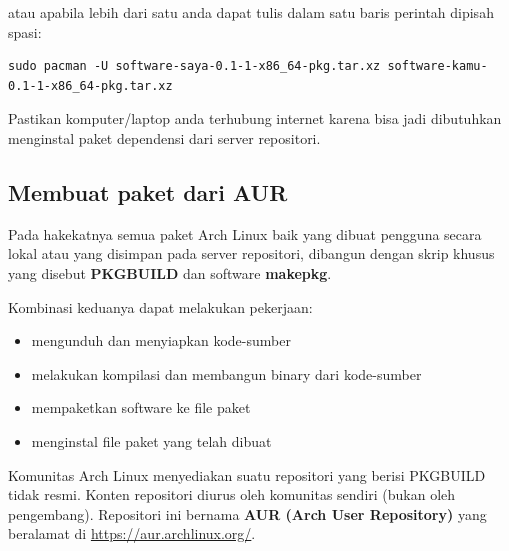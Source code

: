 \documentclass[12pt,]{article}
\begin{document}
	atau apabila lebih dari satu anda dapat tulis dalam satu baris perintah dipisah spasi:
	\begin{verbatim}
sudo pacman -U software-saya-0.1-1-x86_64-pkg.tar.xz software-kamu-0.1-1-x86_64-pkg.tar.xz
	\end{verbatim}
	
	Pastikan komputer/laptop anda terhubung internet karena bisa jadi dibutuhkan menginstal paket dependensi dari server repositori.
	
	\subsection{Membuat paket dari AUR}
	Pada hakekatnya semua paket Arch Linux baik yang dibuat pengguna secara lokal atau yang disimpan pada server repositori,
	dibangun dengan skrip khusus yang disebut \textbf{PKGBUILD} dan software \textbf{makepkg}.
	
	Kombinasi keduanya dapat melakukan pekerjaan:
	\begin{itemize}
		\item mengunduh dan menyiapkan kode-sumber
		\item melakukan kompilasi dan membangun binary dari kode-sumber
		\item mempaketkan software ke file paket
		\item menginstal file paket yang telah dibuat
	\end{itemize}

	Komunitas Arch Linux menyediakan suatu repositori yang berisi PKGBUILD tidak resmi.
	Konten repositori diurus oleh komunitas sendiri (bukan oleh pengembang).
	Repositori ini bernama \textbf{AUR (Arch User Repository)} yang beralamat di \url{https://aur.archlinux.org/}.
	
\end{document}
